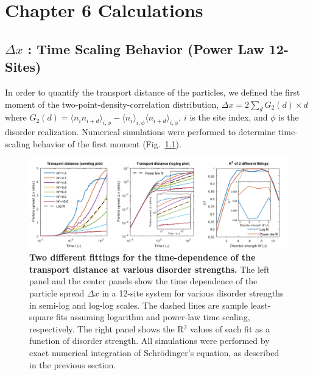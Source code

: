 
%


\chapter{Chapter 6 Calculations}
\label{appendix:Ch6Cal}

\section{$\Delta x$ : Time Scaling Behavior (Power Law 12-Sites)}

In order to quantify the transport distance of the particles, we defined the first moment of the two-point-density-correlation distribution, $\Delta x = 2 \sum_d G_2(d) \times  d$ where $G_2(d) = \langle n_i n_{i+d} \rangle_{i,\phi} - \langle n_i \rangle_{i,\phi} \langle n_{i+d} \rangle_{i,\phi}$, $i$ is the site index, and $\phi$ is the disorder realization. Numerical simulations were performed to determine time-scaling behavior of the first moment (Fig.~\ref{fig:logFit}).

\begin{figure}[t!]
	\includegraphics[width=\columnwidth]{figures/ch6/logFit.pdf}
	\caption{\textbf{Two different fittings for the time-dependence of the transport distance at various disorder strengths.} The left panel and the center panels show the time dependence of the particle spread $\Delta x$ in a 12-site system for various disorder strengths in semi-log and log-log scales. The dashed lines are sample least-square fits assuming logarithm and power-law time scaling, respectively. The right panel shows the R$^2$ values of each fit as a function of disorder strength. All simulations were performed by exact numerical integration of Schr\"{o}dinger's equation, as described in the previous section.
	}
	\label{fig:logFit}
\end{figure}

